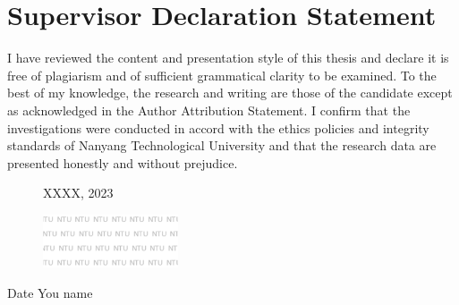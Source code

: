 \chapter*{Supervisor Declaration Statement}
\vspace*{-0.5cm}
\begin{spacing}{2}
\noindent I have reviewed the content and presentation style of this thesis and declare it is free of plagiarism and of sufficient grammatical clarity to be examined.  To the best of my knowledge, the research and writing are those of the candidate except as acknowledged in the Author Attribution Statement. I confirm that the investigations were conducted in accord with the ethics policies and integrity standards of Nanyang Technological University and that the research data are presented honestly and without prejudice.
\end{spacing}
\vspace*{6cm}
\begin{figure}[htbp]
  \begin{minipage}[c]{0.5\textwidth}
    XXXX, 2023
  \end{minipage}\hfill
  \begin{minipage}[c]{0.45\textwidth}
    \includegraphics[width=4cm]{pre_figure/ntu_water.png}
  \end{minipage}
\end{figure}
\vspace*{-0.1cm}
Date \hspace{7cm} You name
\clearpage
\thispagestyle{empty}
\mbox{} 
\newpage
\setcounter{page}{3}